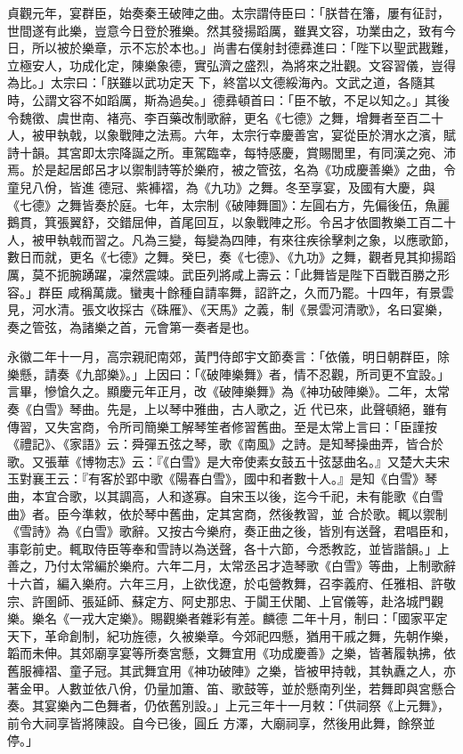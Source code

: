 \begin{pinyinscope}
 貞觀元年，宴群臣，始奏秦王破陣之曲。太宗謂侍臣曰：「朕昔在籓，屢有征討，世間遂有此樂，豈意今日登於雅樂。然其發揚蹈厲，雖異文容，功業由之，致有今日，所以被於樂章，示不忘於本也。」尚書右僕射封德彞進曰：「陛下以聖武戡難，立極安人，功成化定，陳樂象德，實弘濟之盛烈，為將來之壯觀。文容習儀，豈得為比。」太宗曰：「朕雖以武功定天
 下，終當以文德綏海內。文武之道，各隨其時，公謂文容不如蹈厲，斯為過矣。」德彞頓首曰：「臣不敏，不足以知之。」其後令魏徵、虞世南、褚亮、李百藥改制歌辭，更名《七德》之舞，增舞者至百二十人，被甲執戟，以象戰陣之法焉。六年，太宗行幸慶善宮，宴從臣於渭水之濱，賦詩十韻。其宮即太宗降誕之所。車駕臨幸，每特感慶，賞賜閭里，有同漢之宛、沛焉。於是起居郎呂才以禦制詩等於樂府，被之管弦，名為《功成慶善樂》之曲，令童兒八佾，皆進
 德冠、紫褲褶，為《九功》之舞。冬至享宴，及國有大慶，與《七德》之舞皆奏於庭。七年，太宗制《破陣舞圖》：左圓右方，先偏後伍，魚麗鵝貫，箕張翼舒，交錯屈伸，首尾回互，以象戰陣之形。令呂才依圖教樂工百二十人，被甲執戟而習之。凡為三變，每變為四陣，有來往疾徐擊刺之象，以應歌節，數日而就，更名《七德》之舞。癸巳，奏《七德》、《九功》之舞，觀者見其抑揚蹈厲，莫不扼腕踴躍，凜然震竦。武臣列將咸上壽云：「此舞皆是陛下百戰百勝之形容。」群臣
 咸稱萬歲。蠻夷十餘種自請率舞，詔許之，久而乃罷。十四年，有景雲見，河水清。張文收採古《硃雁》、《天馬》之義，制《景雲河清歌》，名曰宴樂，奏之管弦，為諸樂之首，元會第一奏者是也。



 永徽二年十一月，高宗親祀南郊，黃門侍郎宇文節奏言：「依儀，明日朝群臣，除樂懸，請奏《九部樂》。」上因曰：「《破陣樂舞》者，情不忍觀，所司更不宜設。」言畢，慘愴久之。顯慶元年正月，改《破陣樂舞》為《神功破陣樂》。二年，太常奏《白雪》琴曲。先是，上以琴中雅曲，古人歌之，近
 代已來，此聲頓絕，雖有傳習，又失宮商，令所司簡樂工解琴笙者修習舊曲。至是太常上言曰：「臣謹按《禮記》、《家語》云：舜彈五弦之琴，歌《南風》之詩。是知琴操曲弄，皆合於歌。又張華《博物志》云：『《白雪》是大帝使素女鼓五十弦瑟曲名。』又楚大夫宋玉對襄王云：『有客於郢中歌《陽春白雪》，國中和者數十人。』是知《白雪》琴曲，本宜合歌，以其調高，人和遂寡。自宋玉以後，迄今千祀，未有能歌《白雪曲》者。臣今準敕，依於琴中舊曲，定其宮商，然後教習，並
 合於歌。輒以禦制《雪詩》為《白雪》歌辭。又按古今樂府，奏正曲之後，皆別有送聲，君唱臣和，事彰前史。輒取侍臣等奉和雪詩以為送聲，各十六節，今悉教訖，並皆諧韻。」上善之，乃付太常編於樂府。六年二月，太常丞呂才造琴歌《白雪》等曲，上制歌辭十六首，編入樂府。六年三月，上欲伐遼，於屯營教舞，召李義府、任雅相、許敬宗、許圉師、張延師、蘇定方、阿史那忠、于闐王伏闍、上官儀等，赴洛城門觀樂。樂名《一戎大定樂》。賜觀樂者雜彩有差。麟德
 二年十月，制曰：「國家平定天下，革命創制，紀功旌德，久被樂章。今郊祀四懸，猶用干戚之舞，先朝作樂，韜而未伸。其郊廟享宴等所奏宮懸，文舞宜用《功成慶善》之樂，皆著履執拂，依舊服褲褶、童子冠。其武舞宜用《神功破陣》之樂，皆被甲持戟，其執纛之人，亦著金甲。人數並依八佾，仍量加簫、笛、歌鼓等，並於懸南列坐，若舞即與宮懸合奏。其宴樂內二色舞者，仍依舊別設。」上元三年十一月敕：「供祠祭《上元舞》，前令大祠享皆將陳設。自今已後，圓丘
 方澤，大廟祠享，然後用此舞，餘祭並停。」




\end{pinyinscope}
